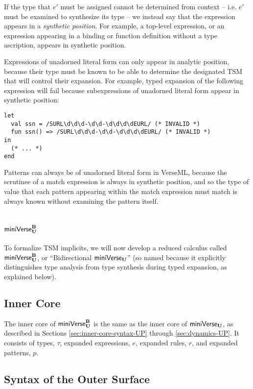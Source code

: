 If the type that $e'$ must be assigned cannot be determined from context -- i.e. $e'$ must be examined to synthesize its type -- we instead say that the expression appears in a \emph{synthetic position}. For example, a top-level expression, or an expression appearing in a binding or function definition without a type ascription, appears in synthetic position.

Expressions of unadorned literal form can only appear in analytic position, because their type must be known to be able to determine the designated TSM that will control their expansion. For example, typed expansion of the following expression will fail because subexpressions of unadorned literal form appear in synthetic position:\newpage
\begin{lstlisting}[numbers=none]
let 
  val ssn = /SURL\d\d\d-\d\d-\d\d\d\dEURL/ (* INVALID *)
  fun ssn() => /SURL\d\d\d-\d\d-\d\d\d\dEURL/ (* INVALID *)
in 
  (* ... *) 
end
\end{lstlisting}

Patterns can always be of unadorned literal form in VerseML, because the scrutinee of a match expression is always in synthetic position, and so the type of value that each pattern appearing within the match expression must match is always known without examining the pattern itself. 
\section{\texorpdfstring{$\mathsf{miniVerse}_\textbf{U}^\textbf{B}$}{Bidirectional miniVerseU}}\label{sec:b-miniverse}
To formalize TSM implicits, we will now develop a reduced calculus called $\mathsf{miniVerse}_\textbf{U}^\textbf{B}$, or ``Bidirectional $\mathsf{miniVerse}_\textbf{U}$'' (so named because it  explicitly distinguishes type analysis from type synthesis during typed expansion, as explained below).

\subsection{Inner Core}
The inner core of $\mathsf{miniVerse}_\textbf{U}^\textbf{B}$ is the same as the inner core of $\mathsf{miniVerse}_\textbf{U}$, as described in Sections \ref{sec:inner-core-syntax-UP} through \ref{sec:dynamics-UP}. It consists of types, $\tau$, expanded expressions, $e$, expanded rules, $r$, and expanded patterns, $p$.

\subsection{Syntax of the Outer Surface}

